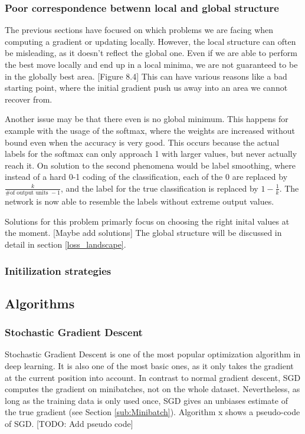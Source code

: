 \subsubsection{Poor correspondence betwenn local and global
structure}\label{prob:5}

The previous sections have focused on which problems we are facing when
computing a gradient or updating locally. However, the local structure can often
be misleading, as it doesn't reflect the global one. Even if we are able to
perform the best move locally and end up in a local minima, we are not
guaranteed to be in the globally best area. [Figure 8.4] This can have various
reasons like a bad starting point, where the initial gradient push us away into
an area we cannot recover from.

Another issue may be that there even is no global minimum. This happens for
example with the usage of the softmax, where the weights are increased without
bound even when the accuracy is very good. This occurs because the actual labels
for the softmax can only approach 1 with larger values, but never actually reach
it.  On solution to the second phenomena would be label smoothing, where instead
of a hard 0-1 coding of the classification, each of the 0 are replaced by
$\frac{k}{\textrm{\# of output units }-1}$, and the label for the true
classification is replaced by $1-\frac{1}{k}$. The network is now able to
resemble the labels without extreme output values.

Solutions for this problem primarly focus on choosing the right inital values at
the moment. [Maybe add solutions] 
The global structure will be discussed in detail in section \ref{loss_landscape}.

\subsubsection{Initilization strategies}




\subsection{Algorithms}
\subsubsection{Stochastic Gradient Descent}\label{SGD}
Stochastic Gradient Descent is one of the most popular optimization algorithm in
deep learning. It is also one of the most basic ones, as it only takes the
gradient at the current position into account. In contrast to normal gradient
descent, SGD computes the gradient on minibatches, not on the whole dataset.
Nevertheless, as long as the training data is only used once, SGD gives an
unbiases estimate of the true gradient (see Section \ref{sub:Minibatch}). Algorithm x
shows a pseudo-code of SGD.
[TODO: Add pseudo code]

